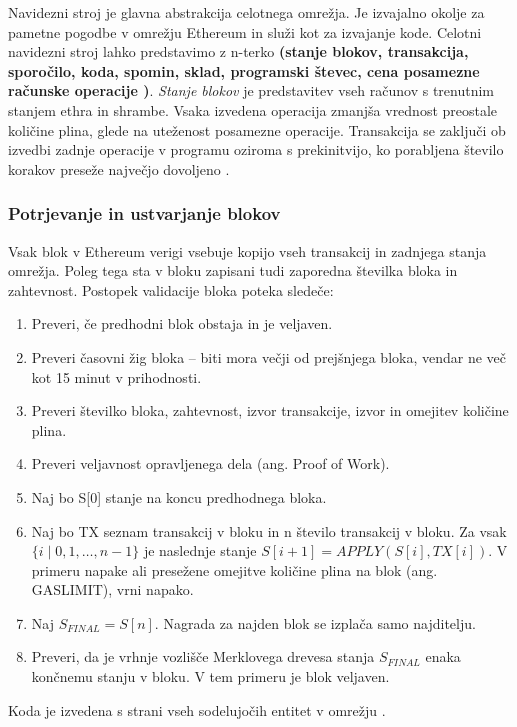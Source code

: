 \documentclass[a4paper, 12pt]{book}
\begin{document}
Navidezni stroj je glavna abstrakcija celotnega omrežja.
Je izvajalno okolje za pametne pogodbe v omrežju Ethereum in služi kot  za izvajanje kode.
Celotni navidezni stroj lahko predstavimo z n-terko \textbf{(stanje blokov, transakcija, sporočilo, koda, spomin, sklad, programski števec, cena posamezne računske operacije )}.
\textit{Stanje blokov} je predstavitev vseh računov s trenutnim stanjem ethra in shrambe.
Vsaka izvedena operacija zmanjša vrednost preostale količine plina, glede na uteženost posamezne operacije.
Transakcija se zaključi ob izvedbi zadnje operacije v programu oziroma s prekinitvijo, ko porabljena število korakov preseže največjo dovoljeno \cite{ethereumWhitepaper}.


\subsubsection{Potrjevanje in ustvarjanje blokov}
\label{confirmTxSub}
Vsak blok v Ethereum verigi vsebuje kopijo vseh transakcij in zadnjega stanja omrežja.
Poleg tega sta v bloku zapisani tudi zaporedna številka bloka in zahtevnost.
Postopek validacije bloka poteka sledeče:
\begin{enumerate}
\item Preveri, če predhodni blok obstaja in je veljaven.
\item Preveri časovni žig bloka -- biti mora večji od prejšnjega bloka, vendar ne več kot 15 minut v prihodnosti.
\item Preveri številko bloka, zahtevnost, izvor transakcije, izvor  in omejitev količine plina.
\item Preveri veljavnost opravljenega dela (ang. Proof of Work).
\item Naj bo S[0] stanje na koncu predhodnega bloka.
\item Naj bo TX seznam transakcij v bloku in n število transakcij v bloku. Za vsak 
$\{i \mid 0,1,\dots, n-1\}$
je naslednje stanje
 $S[i+1] = APPLY(S[i], TX[i])$.
V primeru napake ali presežene omejitve količine plina na blok (ang. GASLIMIT), vrni napako.
\item Naj $S_{FINAL} = S[n]$. Nagrada za najden blok se izplača samo najditelju.
\item Preveri, da je vrhnje vozlišče Merklovega drevesa stanja $S_{FINAL}$ enaka končnemu stanju v bloku. V tem primeru je blok veljaven.
\end{enumerate}

Koda je izvedena s strani vseh sodelujočih entitet v omrežju \cite{ethereumWhitepaper}.
\end{document}
